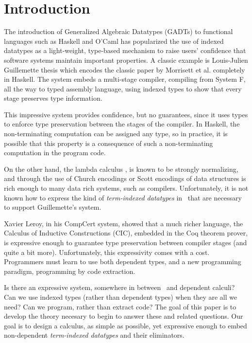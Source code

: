 \section{Introduction}
\label{sec:intro}


The introduction of Generalized Algebraic Datatypes (GADTs) to functional
languages such as Haskell and O'Caml has popularized the use of indexed datatypes
as a light-weight, type-based mechanism to raise users' confidence that software systems
maintain important properties. A classic example is 
Louis-Julien Guillemette thesis\cite{guillemetteThesis} which encodes the classic 
paper by Morrisett et al.\cite{tal-toplas} completely in Haskell. The 
system embeds a multi-stage compiler, compiling from System F, all the way
to typed assembly language, using indexed
types to show that every stage preserves type information.

This impressive system provides confidence, but no guarantees, since it uses types to enforce
type preservation between the stages of the compiler. In Haskell, the non-terminating computation
can be assigned any type, so in practice, it is possible that this property is a consequence
of such a non-terminating computation in the program code.

On the other hand, the lambda calculus \Fw, is known to be strongly normalizing, and
through the use of Church encodings or Scott encodings of data structures is rich enough
to many data rich systems, such as compilers. Unfortunately, it is not known
how to express the kind of \emph{term-indexed datatypes} in \Fw\ that are necessary to
support Guillemette's system.

Xavier Leroy, in his CompCert system\cite{Leroy-Compcert-CACM}, showed that a much richer
language, the Calculus of Inductive Constructions (CIC), embedded in the Coq theorem prover,
is expressive enough to guarantee type preservation between compiler stages
(and quite a bit more). Unfortunately, this expressivity comes with a cost.
Programmers must learn to use both dependent types, and a new programming
paradigm, programming by code extraction.

Is there an expressive system, somewhere in between \Fw\ and dependent calculi?
Can we use indexed types (rather than dependent types) when they are all
we need? Can we program, rather than extract code?
The goal of this paper is to develop the theory necesary to begin to answer
these and related questions.
Our goal is to design a calculus, as simple as possible, yet expressive enough
to embed non-dependent \emph{term-indexed datatypes} and their eliminators.

